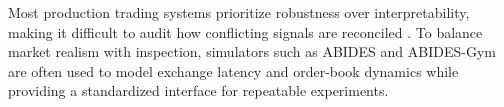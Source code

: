 \documentclass{article}
\begin{document}
Most production trading systems prioritize robustness over interpretability, making it difficult to audit how conflicting signals are reconciled \citep{fticonsulting2023}. To balance market realism with inspection, simulators such as ABIDES \citep{abides2019} and ABIDES-Gym \citep{abidesgym2021} are often used to model exchange latency and order-book dynamics while providing a standardized interface for repeatable experiments.
\end{document}
